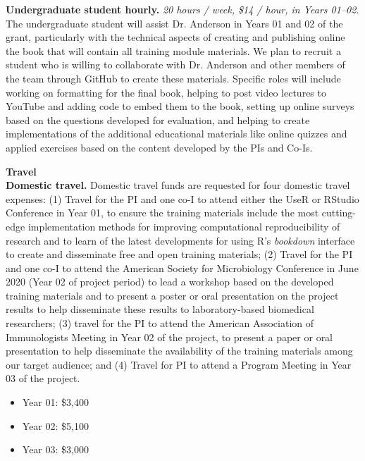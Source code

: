 \documentclass[pdftex,english,11pt,parskip=half]{scrartcl}
\begin{document}
\noindent \textbf{Undergraduate student hourly.} \textit{20 hours / week, \$14 / hour, in Years 01--02.} The undergraduate student will assist Dr. Anderson in Years 01 and 02 of the grant, particularly with the technical aspects of creating and publishing online the book that will contain all training module materials. We plan to recruit a student who is willing to collaborate with Dr. Anderson and other members of the team through GitHub to create these materials. Specific roles will include working on formatting for the final book, helping to post video lectures to YouTube and adding code to embed them to the book, setting up online surveys based on the questions developed for evaluation, and helping to create implementations of the additional educational materials like online quizzes and applied exercises based on the content developed by the PIs and Co-Is. 

{\large \textbf{Travel}} \\

\noindent \textbf{Domestic travel.} Domestic travel funds are requested for four domestic travel expenses: (1) Travel for the PI and one co-I to attend either the UseR or RStudio Conference in Year 01, to ensure the training materials include the most cutting-edge implementation methods for improving computational reproducibility of research and to learn of the latest developments for using R's \textit{bookdown} interface to create and disseminate free and open training materials; (2) Travel for the PI and one co-I to attend the American Society for Microbiology Conference in June 2020 (Year 02 of project period) to lead a workshop based on the developed training materials and to present a poster or oral presentation on the project results to help disseminate these results to laboratory-based biomedical researchers; (3) travel for the PI to attend the American Association of Immunologists Meeting in Year 02 of the project, to present a paper or oral presentation to help disseminate the availability of the training materials among our target audience; and (4) Travel for PI to attend a Program Meeting in Year 03 of the project. 
\begin{itemize}
\item Year 01: \$3,400
\item Year 02: \$5,100
\item Year 03: \$3,000
\end{itemize}
\end{document}
